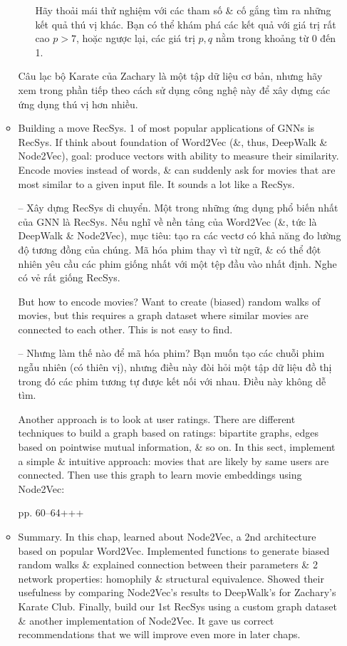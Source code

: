\documentclass{article}
\begin{document}
\begin{itemize}
\begin{itemize}
\begin{itemize}
            Hãy thoải mái thử nghiệm với các tham số \& cố gắng tìm ra những kết quả thú vị khác. Bạn có thể khám phá các kết quả với giá trị rất cao $p > 7$, hoặc ngược lại, các giá trị $p,q$ nằm trong khoảng từ 0 đến 1.
        \end{itemize}
        Câu lạc bộ Karate của Zachary là một tập dữ liệu cơ bản, nhưng hãy xem trong phần tiếp theo cách sử dụng công nghệ này để xây dựng các ứng dụng thú vị hơn nhiều.
        \item {\sf Building a move RecSys.} 1 of most popular applications of GNNs is RecSys. If think about foundation of Word2Vec (\&, thus, DeepWalk \& Node2Vec), goal: produce vectors with ability to measure their similarity. Encode movies instead of words, \& can suddenly ask for movies that are most similar to a given input file. It sounds a lot like a RecSys.

        -- {\sf Xây dựng RecSys di chuyển.} Một trong những ứng dụng phổ biến nhất của GNN là RecSys. Nếu nghĩ về nền tảng của Word2Vec (\&, tức là DeepWalk \& Node2Vec), mục tiêu: tạo ra các vectơ có khả năng đo lường độ tương đồng của chúng. Mã hóa phim thay vì từ ngữ, \& có thể đột nhiên yêu cầu các phim giống nhất với một tệp đầu vào nhất định. Nghe có vẻ rất giống RecSys.

        But how to encode movies? Want to create (biased) random walks of movies, but this requires a graph dataset where similar movies are connected to each other. This is not easy to find.

        -- Nhưng làm thế nào để mã hóa phim? Bạn muốn tạo các chuỗi phim ngẫu nhiên (có thiên vị), nhưng điều này đòi hỏi một tập dữ liệu đồ thị trong đó các phim tương tự được kết nối với nhau. Điều này không dễ tìm.

        Another approach is to look at user ratings. There are different techniques to build a graph based on ratings: bipartite graphs, edges based on pointwise mutual information, \& so on. In this sect, implement a simple \& intuitive approach: movies that are likely by same users are connected. Then use this graph to learn movie embeddings using Node2Vec:

        pp. 60--64+++
        \item {\sf Summary.} In this chap, learned about Node2Vec, a 2nd architecture based on popular Word2Vec. Implemented functions to generate biased random walks \& explained connection between their parameters \& 2 network properties: homophily \& structural equivalence. Showed their usefulness by comparing Node2Vec's results to DeepWalk's for Zachary's Karate Club. Finally, build our 1st RecSys using a custom graph dataset \& another implementation of Node2Vec. It gave us correct recommendations that we will improve even more in later chaps.


\end{itemize}
\end{itemize}
\end{document}
